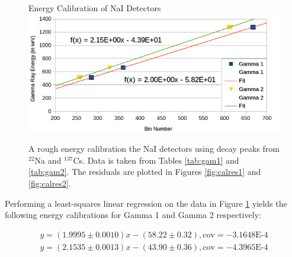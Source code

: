 \documentclass[10pt]{IEEEtran}
\begin{document}
    \begin{figure}[!hbpt]
        \begin{center}
        \normalsize{Energy Calibration of NaI Detectors}
        \includegraphics[width=\columnwidth]{Cal}
        \caption{A rough energy calibration the NaI detectors using decay peaks from $^{22}$Na and $^{137}$Cs. Data is taken from Tables \ref{tab:gam1} and \ref{tab:gam2}. The residuals are plotted in Figures \ref{fig:calres1} and \ref{fig:calres2}.}    
        \label{fig:cal}
        \end{center}
    \end{figure}
Performing a least-squares linear regression on the data in Figure \ref{fig:cal} yields the following energy calibrations for Gamma 1 and Gamma 2 respectively:

\begin{eqnarray*}
y = (1.9995\pm 0.0010)x-(58.22\pm 0.32), \text{cov}=-3.1648\text{E-4} \\
y = (2.1535\pm 0.0013)x-(43.90\pm 0.36), \text{cov}=-4.3965\text{E-4} \\
\end{eqnarray*}
\end{document}
